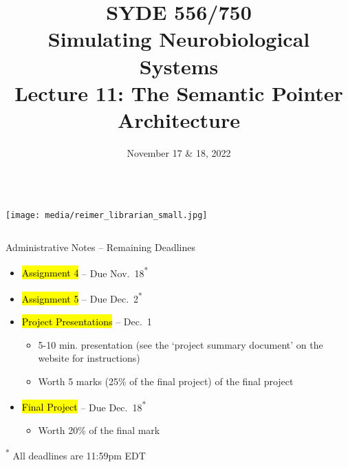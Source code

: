 \documentclass[handout,aspectratio=169]{beamer}
\date{November 17 \& 18, 2022}
\title{SYDE 556/750 \\ Simulating Neurobiological Systems \\ Lecture 11: The Semantic Pointer Architecture}
\begin{document}
	
	\begin{frame}{}
		\vspace{0.5cm}
		\begin{columns}[c]
			\MakeTitle
			\texttt{[image: media/reimer\_librarian\_small.jpg]}
		\end{columns}
	\end{frame}

	\begin{frame}{Administrative Notes -- Remaining Deadlines}
		\begin{itemize}
			\setlength{\itemsep}{0.5cm}
			\item \hl{Assignment 4} -- Due Nov.~18\textsuperscript{*}
			\item \hl{Assignment 5} -- Due Dec.~2\textsuperscript{*}
			\item \hl{Project Presentations} --  Dec.~1\\[0.125cm]
			\begin{itemize}
				\setlength{\itemsep}{0.125cm}
				\item 5-10 min. presentation (see the `project summary document' on the website for instructions)
				\item Worth 5 marks (25\% of the final project) of the final project
			\end{itemize}
			\item \hl{Final Project} -- Due Dec.~18\textsuperscript{*}\\[0.125cm]
			\begin{itemize}
				\item Worth 20\% of the final mark
			\end{itemize}
		\end{itemize}
		\vspace{0.5cm}
		{\footnotesize\color{aluminium4}\textsuperscript{*} All deadlines are 11:59pm EDT}
	\end{frame}
\end{document}
